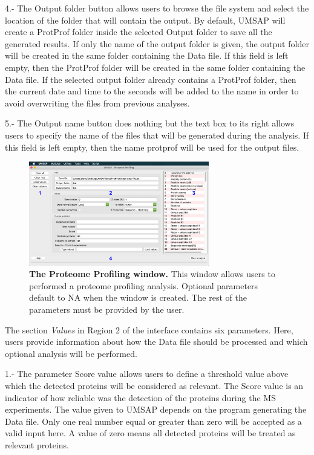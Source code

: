\num{4}.- The Output folder\label{par:protprofOutFolder} button allows users to browse the file system and select the location of the folder that will contain the output. By default, UMSAP will create a ProtProf folder inside the selected Output folder to save all the generated results. If only the name of the output folder is given, the output folder will be created in the same folder containing the Data file. If this field is left empty, then the ProtProf folder will be created in the same folder containing the Data file. If the selected output folder already contains a ProtProf folder, then the current date and time to the seconds will be added to the name in order to avoid overwriting the files from previous analyses.

\num{5}.- The Output name button does nothing but the text box to its right allows users to specify the name of the files that will be generated during the analysis. If this field is left empty, then the name protprof will be used for the output files. 

\begin{figure}[h]
	\centering
	\includegraphics[width=0.7\textwidth]{./IMAGES/MOD-PROTPROF/protprof-mod.jpg}
	\caption[The Proteome Profiling window]{\textbf{The Proteome Profiling window.} This window allows users to performed a proteome profiling analysis. Optional parameters default to NA when the window is created. The rest of the parameters must be provided by the user.} 
	\label{fig:protprofMainWindow}
	\vspace{-5pt} 	
\end{figure} 

The section \textit{Values} in Region \num{2} of the interface contains six parameters. Here, users provide information about how the Data file should be processed and which optional analysis will be performed.

\num{1}.- The parameter Score value\label{par:protprofScoreValue} allows users to define a threshold value above which the detected proteins will be considered as relevant. The Score value is an indicator of how reliable was the detection of the proteins during the MS experiments. The value given to UMSAP depends on the program generating the Data file. Only one real number equal or greater than zero will be accepted as a valid input here. A value of zero means all detected proteins will be treated as relevant proteins.

